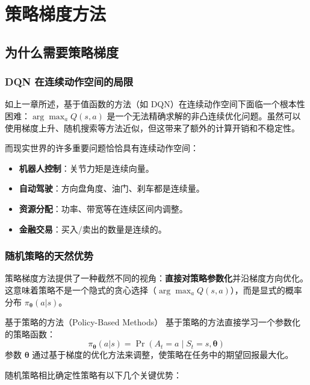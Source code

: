 \chapter{策略梯度方法}


\section{为什么需要策略梯度}

\subsection{DQN 在连续动作空间的局限}

如上一章所述，基于值函数的方法（如 DQN）在连续动作空间下面临一个根本性困难：$\arg\max_a Q(s,a)$ 是一个无法精确求解的非凸连续优化问题。虽然可以使用梯度上升、随机搜索等方法近似，但这带来了额外的计算开销和不稳定性。

而现实世界的许多重要问题恰恰具有连续动作空间：
\begin{itemize}
    \item \textbf{机器人控制}：关节力矩是连续向量。
    \item \textbf{自动驾驶}：方向盘角度、油门、刹车都是连续量。
    \item \textbf{资源分配}：功率、带宽等在连续区间内调整。
    \item \textbf{金融交易}：买入/卖出的数量是连续的。
\end{itemize}

\subsection{随机策略的天然优势}

策略梯度方法提供了一种截然不同的视角：\textbf{直接对策略参数化}并沿梯度方向优化。这意味着策略不是一个隐式的贪心选择（$\arg\max_a Q(s,a)$），而是显式的概率分布 $\pi_{\boldsymbol{\theta}}(a|s)$。

\begin{mydefinition}{基于策略的方法（Policy-Based Methods）}
基于策略的方法直接学习一个参数化的策略函数：
$$\pi_{\boldsymbol{\theta}}(a|s) = \Pr(A_t = a \mid S_t = s, \boldsymbol{\theta})$$
参数 $\boldsymbol{\theta}$ 通过基于梯度的优化方法来调整，使策略在任务中的期望回报最大化。
\end{mydefinition}

随机策略相比确定性策略有以下几个关键优势：

